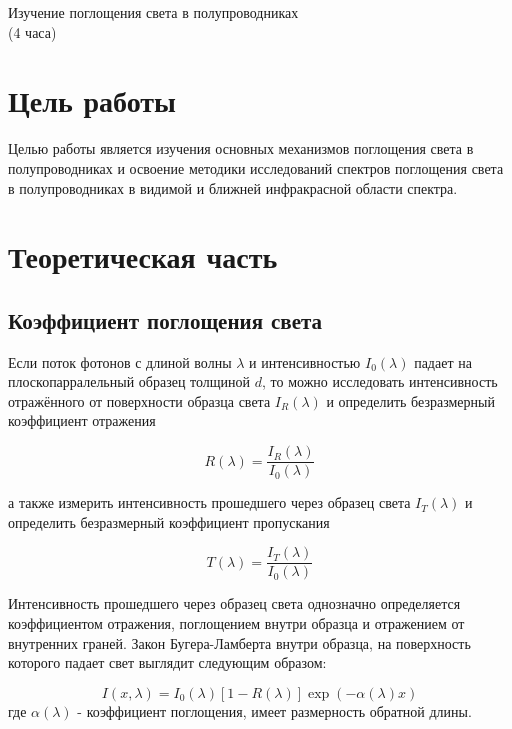 \newpage

\setcounter{chapter}{6}

\begin{center}
Изучение поглощения света в полупроводниках\\
(4 часа)
\end{center}

\section{Цель работы}
Целью работы является изучения основных механизмов поглощения света в полупроводниках и освоение методики исследований спектров поглощения света в полупроводниках в видимой и ближней инфракрасной области спектра.

\section{Теоретическая часть}
\subsection{Коэффициент поглощения света}
Если поток фотонов с длиной волны $\lambda$ и интенсивностью $I_{0}(\lambda)$ падает на плоскопарралельный образец толщиной $d$, то можно исследовать интенсивность отражённого от поверхности образца света $I_{R}(\lambda)$ и определить безразмерный коэффициент отражения

\begin{equation}
R(\lambda) = \frac{I_{R}(\lambda)}{I_{0}(\lambda)}
\end{equation}

а также измерить интенсивность прошедшего через образец света $I_{T}(\lambda)$ и определить безразмерный коэффициент пропускания

\begin{equation}
T(\lambda) = \frac{I_{T}(\lambda)}{I_{0}(\lambda)}
\end{equation}

Интенсивность прошедшего через образец света однозначно определяется коэффициентом отражения, поглощением внутри образца и отражением от внутренних граней. Закон Бугера-Ламберта внутри образца, на поверхность которого падает свет выглядит следующим образом:

\begin{equation}
I(x, \lambda) = I_{0}(\lambda) \left[ 1 - R(\lambda) \right] \exp{(- \alpha (\lambda) x )}
\end{equation}
где $\alpha(\lambda)$ - коэффициент поглощения, имеет размерность обратной длины.

